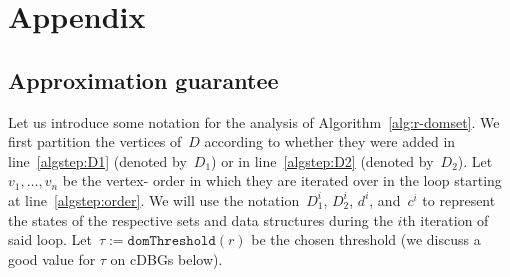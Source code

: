 \appendix

\section{Appendix}

\subsection{Approximation guarantee}\label{app:threshold}

Let us introduce some notation for the analysis of
Algorithm~\ref{alg:r-domset}. We first partition the vertices of~$D$ according
to whether they were added in line~\ref{algstep:D1} (denoted by~$D_1$) or in
line~\ref{algstep:D2} (denoted by~$D_2$). Let~$v_1,\ldots,v_n$ be the vertex-
order in which they are iterated over in the loop starting at
line~\ref{algstep:order}. We will use the notation~$D_1^i$, $D_2^i$, $d^i$,
and~$c^i$ to represent the states of the respective sets and data structures
during the $i$th iteration of said loop. Let~$\tau :=
\texttt{domThreshold}(r)$ be the chosen threshold (we discuss a good value
for $\tau$ on cDBGs below).

